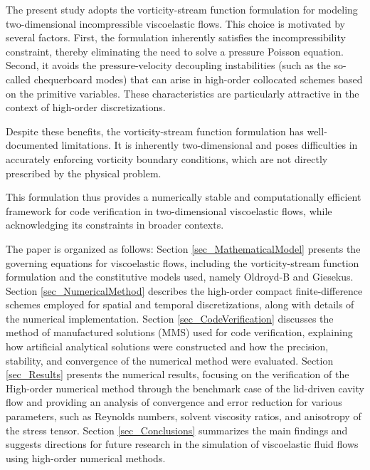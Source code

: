 \documentclass[preprint, 12pt]{elsarticle}
\begin{document}
The present study adopts the vorticity-stream function formulation for modeling two-dimensional incompressible viscoelastic flows. This choice is motivated by several factors. First, the formulation inherently satisfies the incompressibility constraint, thereby eliminating the need to solve a pressure Poisson equation. Second, it avoids the pressure-velocity decoupling instabilities (such as the so-called chequerboard modes) that can arise in high-order collocated schemes based on the primitive variables. These characteristics are particularly attractive in the context of high-order discretizations.

Despite these benefits, the vorticity-stream function formulation has well-documented limitations. It is inherently two-dimensional and poses difficulties in accurately enforcing vorticity boundary conditions, which are not directly prescribed by the physical problem.

This formulation thus provides a numerically stable and computationally efficient framework for code verification in two-dimensional viscoelastic flows, while acknowledging its constraints in broader contexts.

The paper is organized as follows: Section \ref{sec_MathematicalModel} presents the governing equations for viscoelastic flows, including the vorticity-stream function formulation and the constitutive models used, namely Oldroyd-B and Giesekus. Section \ref{sec_NumericalMethod} describes the high-order compact finite-difference schemes employed for spatial and temporal discretizations, along with details of the numerical implementation. Section \ref{sec_CodeVerification} discusses the method of manufactured solutions (MMS) used for code verification, explaining how artificial analytical solutions were constructed and how the precision, stability, and convergence of the numerical method were evaluated. Section \ref{sec_Results} presents the numerical results, focusing on the verification of the High-order numerical method through the benchmark case of the lid-driven cavity flow and providing an analysis of convergence and error reduction for various parameters, such as Reynolds numbers, solvent viscosity ratios, and anisotropy of the stress tensor. Section \ref{sec_Conclusions} summarizes the main findings and suggests directions for future research in the simulation of viscoelastic fluid flows using high-order numerical methods.

\end{document}
